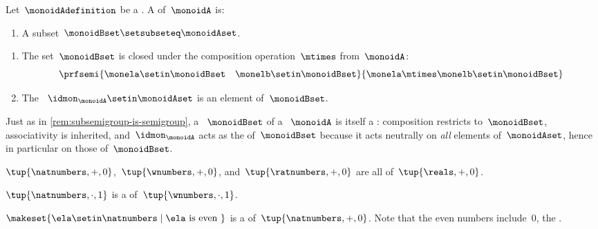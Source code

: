 \begin{ctdefinition}[Submonoid]\label{def:submonoids}
    Let~$\monoidAdefinition$ be a .
    A  of~$\monoidA$ is:

    \constit

    \begin{enumerate}
        \item A subset~$\monoidBset \setsubseteq \monoidAset$.
    \end{enumerate}

    \condit

    \begin{enumerate}
        \item The set~$\monoidBset$ is closed under the composition operation~$\mtimes$ from~$\monoidA$:
              \begin{equation}
                  \prfsemi{\monela \setin \monoidBset \quad \monelb \setin \monoidBset}{\monela \mtimes \monelb \setin \monoidBset}
              \end{equation}

        \item The ~$\idmon_\monoidA \setin \monoidAset$ is an element of~$\monoidBset$.
    \end{enumerate}
\end{ctdefinition}

\begin{remark}
    \label{rem:submonoid-is-monoid}
    Just as in \cref{rem:subsemigroup-is-semigroup}, a ~$\monoidBset$ of a ~$\monoidA$ is itself a : composition restricts to~$\monoidBset$, associativity is inherited, and~$\idmon_\monoidA$ acts as the  of~$\monoidBset$ because it acts neutrally on \emph{all} elements of~$\monoidAset$, hence in particular on those of~$\monoidBset$.
\end{remark}

\begin{example}
    $\tup{\natnumbers, +, 0}$,~$\tup{\wnumbers, +, 0}$, and~$\tup{\ratnumbers, +, 0}$ are all  of~$\tup{\reals, +, 0}$.
\end{example}

\begin{example}
    $\tup{\natnumbers, \cdot, 1}$ is a  of~$\tup{\wnumbers, \cdot, 1}$.
\end{example}

\begin{example}
    $\makeset{ \ela \setin \natnumbers \mid \ela \text{ is even } }$ is a  of~$\tup{\natnumbers, +, 0}$.
    Note that the even numbers include~$0$, the .
\end{example}

